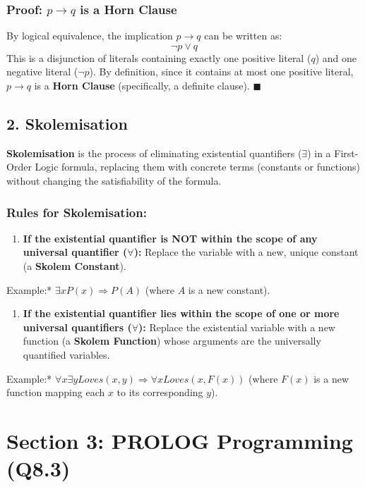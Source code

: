 \subsubsection{Proof: $p \rightarrow q$ is a Horn Clause}
By logical equivalence, the implication $p \rightarrow q$ can be written as:
\[ \neg p \lor q \]
This is a disjunction of literals containing exactly one positive literal ($q$) and one negative literal ($\neg p$). By definition, since it contains at most one positive literal, $p \rightarrow q$ is a \textbf{Horn Clause} (specifically, a definite clause). $\blacksquare$


\subsection{2. Skolemisation}
\textbf{Skolemisation} is the process of eliminating existential quantifiers ($\exists$) in a First-Order Logic formula, replacing them with concrete terms (constants or functions) without changing the satisfiability of the formula.

\subsubsection{Rules for Skolemisation:}
\begin{enumerate}
  \item \textbf{If the existential quantifier is NOT within the scope of any universal quantifier ($\forall$):} Replace the variable with a new, unique constant (a \textbf{Skolem Constant}).
\end{enumerate}
    \textit{   }Example:* $\exists x P(x) \Longrightarrow P(A)$ (where $A$ is a new constant).
\begin{enumerate}
  \item \textbf{If the existential quantifier lies within the scope of one or more universal quantifiers ($\forall$):} Replace the existential variable with a new function (a \textbf{Skolem Function}) whose arguments are the universally quantified variables.
\end{enumerate}
    \textit{   }Example:* $\forall x \exists y Loves(x, y) \Longrightarrow \forall x Loves(x, F(x))$ (where $F(x)$ is a new function mapping each $x$ to its corresponding $y$).


\section{Section 3: PROLOG Programming (Q8.3)}

